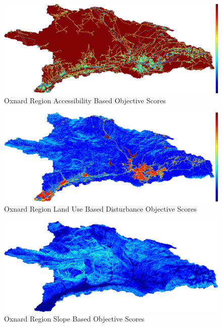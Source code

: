         \begin{figure}[!h]
            \begin{center}
            \includegraphics[width=5.5in]{figures/Oxnard_AccessibilityScore.png}   
            \caption{Oxnard Region Accessibility Based Objective Scores}
            \label{fig:Oaccessibility}
            \end{center}
        \end{figure}

        \begin{figure}[!h]
            \begin{center}
            \includegraphics[width=5.5in]{figures/Oxnard_DisturbanceScore.png}   
            \caption{Oxnard Region Land Use Based Disturbance Objective Scores}
            \label{fig:Odisturbance}
            \end{center}
        \end{figure}
        
        \begin{figure}[!h]
            \begin{center}
            \includegraphics[width=5.5in]{figures/Oxnard_SlopeScore.png}   
            \caption{Oxnard Region Slope Based Objective Scores}
            \label{fig:Oslope}
            \end{center}
        \end{figure}
        
